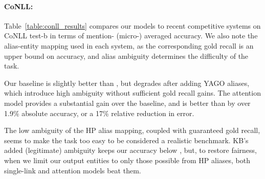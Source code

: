 \paragraph*{CoNLL:}
Table~\ref{table:conll_results} compares our models to recent
competitive systems on CoNLL test-b in terms of mention- (micro-)
averaged accuracy.  We also note the alias-entity mapping used in each
system, as the corresponding gold recall is an upper bound on
accuracy, and alias ambiguity determines the difficulty of the task.

Our baseline is slightly better than , but degrades
after adding YAGO aliases, which introduce high ambiguity without sufficient
gold recall gains. The attention model provides a substantial gain over
the baseline, and is better than  by over
1.9\% absolute accuracy, or a 17\% relative reduction in error.

The low ambiguity of the HP alias mapping, coupled with
guaranteed gold recall, seems to make the task too easy to be
considered a realistic benchmark.  KB's added (legitimate) ambiguity
keeps our accuracy below , but, to restore
fairness, when we limit our output entities to only those possible
from HP aliases, both single-link and attention models beat them.



